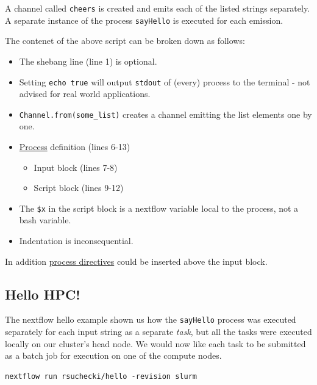 A channel called \texttt{cheers} is created and emits each of the listed strings separately. 
A separate instance of the process \texttt{sayHello} is executed for each emission. 

\begin{note}
The contenet of the above script can be broken down as follows:
\begin{itemize}
  \item The shebang line (line 1) is optional.
  \item Setting \texttt{echo true} will output \texttt{stdout} of (every) process to the terminal - not advised for real world applications.
  \item \texttt{Channel.from(some\_list)} creates a channel emitting the list elements one by one.
  \item \href{https://www.nextflow.io/docs/latest/process.html}{Process} definition (lines 6-13)
  \begin{itemize}
    \item Input block (lines 7-8)
    \item Script block (lines 9-12)
  \end{itemize}
  \item The \texttt{\$x} in the script block is a nextflow variable local to the process, not a bash variable.
  \item Indentation is inconsequential. 
\end{itemize}
In addition \href{https://www.nextflow.io/docs/latest/process.html#directives}{process directives} could be inserted above the input block.
\end{note}


\subsection{Hello HPC!}

The nextflow hello example shown us how the \texttt{sayHello} process was executed separately for each input string as a separate \emph{task}, but all the tasks were executed locally on our cluster's head node. 
We would now like each task to be submitted as a batch job for execution on one of the compute nodes.

\begin{steps}
\begin{lstlisting}
nextflow run rsuchecki/hello -revision slurm
\end{lstlisting}
\end{steps}

